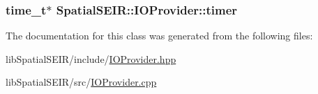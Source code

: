 \hypertarget{classSpatialSEIR_1_1IOProvider_acab89531190c3433ea0fe1bc3f14aa0f}{
\subsubsection[{timer}]{\setlength{\rightskip}{0pt plus 5cm}time\-\_\-t$\ast$ Spatial\-S\-E\-I\-R\-::\-I\-O\-Provider\-::timer}}\label{classSpatialSEIR_1_1IOProvider_acab89531190c3433ea0fe1bc3f14aa0f}


The documentation for this class was generated from the following files\-:\begin{DoxyCompactItemize}
\item 
lib\-Spatial\-S\-E\-I\-R/include/\hyperlink{IOProvider_8hpp}{I\-O\-Provider.\-hpp}\item 
lib\-Spatial\-S\-E\-I\-R/src/\hyperlink{IOProvider_8cpp}{I\-O\-Provider.\-cpp}\end{DoxyCompactItemize}
